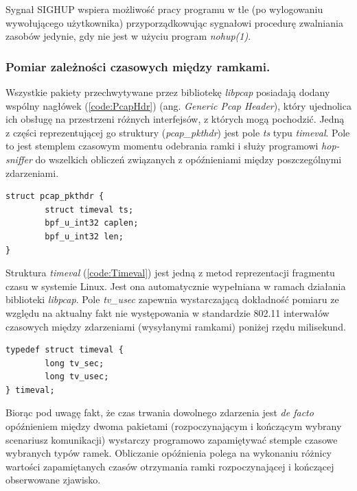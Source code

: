 Sygnał SIGHUP wspiera możliwość pracy programu w tle (po wylogowaniu wywołującego użytkownika) przyporządkowując sygnałowi procedurę zwalniania zasobów jedynie, gdy nie jest w użyciu program \emph{nohup(1)}. 

\subsubsection{Pomiar zależności czasowych między ramkami.} 

Wszystkie pakiety przechwytywane przez bibliotekę \emph{libpcap} posiadają dodany wspólny nagłówek (\ref{code:PcapHdr}) (ang. \emph{Generic Pcap Header}), który ujednolica ich obsługę na przestrzeni różnych interfejsów, z których mogą pochodzić. Jedną z części reprezentującej go struktury (\emph{pcap\_pkthdr}) jest pole \emph{ts} typu \emph{timeval}. Pole to jest stemplem czasowym momentu odebrania ramki i służy programowi \emph{hop-sniffer} do wszelkich obliczeń związanych z opóźnieniami między poszczególnymi zdarzeniami.

\begin{lstlisting}[frame=tb]
struct pcap_pkthdr {
        struct timeval ts;  
        bpf_u_int32 caplen; 
        bpf_u_int32 len;
}
\end{lstlisting}

Struktura \emph{timeval} (\ref{code:Timeval}) jest jedną z metod reprezentacji fragmentu czasu w systemie Linux. Jest ona automatycznie wypełniana w ramach działania biblioteki \emph{libpcap}. Pole \emph{tv\_usec} zapewnia wystarczającą dokładność pomiaru ze względu na aktualny fakt nie występowania w standardzie 802.11 interwałów czasowych między zdarzeniami (wysyłanymi ramkami) poniżej rzędu milisekund. 

\begin{lstlisting}[frame=tb]
typedef struct timeval {
        long tv_sec;
        long tv_usec;
} timeval;
\end{lstlisting}

Biorąc pod uwagę fakt, że czas trwania dowolnego zdarzenia jest \emph{de facto} opóźnieniem między dwoma pakietami (rozpoczynającym i kończącym wybrany scenariusz komunikacji) wystarczy programowo zapamiętywać stemple czasowe wybranych typów ramek. Obliczanie opóźnienia polega na wykonaniu różnicy wartości zapamiętanych czasów otrzymania ramki rozpoczynającej i kończącej obserwowane zjawisko. 

